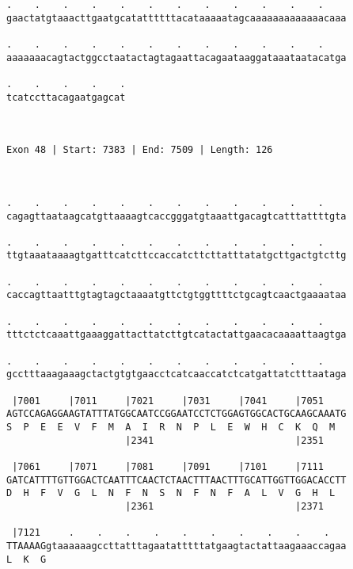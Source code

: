 \documentclass{article}
\begin{document}
\begin{Verbatim}
.    .    .    .    .    .    .    .    .    .    .    .    
gaactatgtaaacttgaatgcatattttttacataaaaatagcaaaaaaaaaaaaacaaa
                                                            
.    .    .    .    .    .    .    .    .    .    .    .    
aaaaaaacagtactggcctaatactagtagaattacagaataaggataaataatacatga
                                                            
.    .    .    .    .
tcatccttacagaatgagcat
                     
                     
 
Exon 48 | Start: 7383 | End: 7509 | Length: 126



.    .    .    .    .    .    .    .    .    .    .    .    
cagagttaataagcatgttaaaagtcaccgggatgtaaattgacagtcatttattttgta
                                                            
.    .    .    .    .    .    .    .    .    .    .    .    
ttgtaaataaaagtgatttcatcttccaccatcttcttatttatatgcttgactgtcttg
                                                            
.    .    .    .    .    .    .    .    .    .    .    .    
caccagttaatttgtagtagctaaaatgttctgtggttttctgcagtcaactgaaaataa
                                                            
.    .    .    .    .    .    .    .    .    .    .    .    
tttctctcaaattgaaaggattacttatcttgtcatactattgaacacaaaattaagtga
                                                            
.    .    .    .    .    .    .    .    .    .    .    .    
gcctttaaagaaagctactgtgtgaacctcatcaaccatctcatgattatctttaataga
                                                            
 |7001     |7011     |7021     |7031     |7041     |7051    
AGTCCAGAGGAAGTATTTATGGCAATCCGGAATCCTCTGGAGTGGCACTGCAAGCAAATG
S  P  E  E  V  F  M  A  I  R  N  P  L  E  W  H  C  K  Q  M  
                     |2341                         |2351    
  
 |7061     |7071     |7081     |7091     |7101     |7111    
GATCATTTTGTTGGACTCAATTTCAACTCTAACTTTAACTTTGCATTGGTTGGACACCTT
D  H  F  V  G  L  N  F  N  S  N  F  N  F  A  L  V  G  H  L  
                     |2361                         |2371    
  
 |7121     .    .    .    .    .    .    .    .    .    .   
TTAAAAGgtaaaaaagccttatttagaatatttttatgaagtactattaagaaaccagaa
L  K  G                                                     
                                                            

\end{Verbatim}
\end{document}
